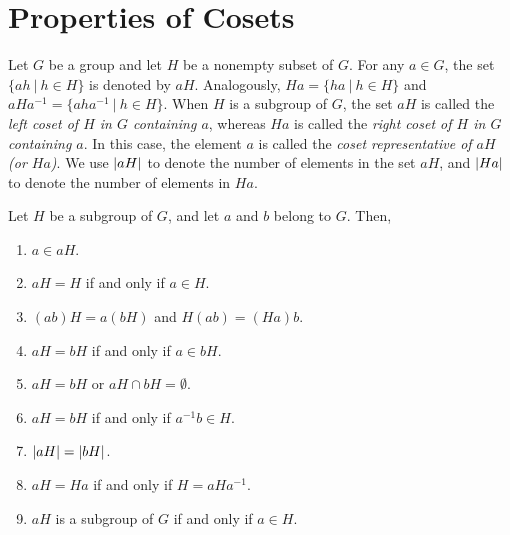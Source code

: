 \section{Properties of Cosets}

\begin{definition}
	Let $G$ be a group and let $H$ be a nonempty subset of $G$. For any $a \in G$, the set $\{ah\ \vert\ h \in H\}$ is denoted by $aH$. Analogously, $Ha = \{ha\ \vert\ h \in H\}$ and $aHa^{-1} = \{aha^{-1}\ \vert\ h \in H\}$. When $H$ is a subgroup of $G$, the set $aH$ is called the \textit{left coset of $H$ in $G$ containing $a$}, whereas $Ha$ is called the \textit{right coset of $H$ in $G$ containing $a$}. In this case, the element $a$ is called the \textit{coset representative of $aH$ (or $Ha$)}. We use $\left\lvert aH \right\rvert$ to denote the number of elements in the set $aH$, and $\left\lvert Ha \right\rvert$ to denote the number of elements in $Ha$.
\end{definition}

\begin{lem}
	Let $H$ be a subgroup of $G$, and let $a$ and $b$ belong to $G$. Then,
	\begin{enumerate}
		\item $a \in aH$.
		\item $aH = H$ if and only if $a \in H$.
		\item $(ab)H = a(bH)$ and $H(ab) = (Ha)b$.
		\item $aH = bH$ if and only if $a \in bH$.
		\item $aH = bH$ or $aH \cap bH = \emptyset$.
		\item $aH = bH$ if and only if $a^{-1}b \in H$.
		\item $\left\lvert aH \right\rvert=\left\lvert bH \right\rvert$.
		\item $aH = Ha$ if and only if $H = aHa^{-1}$.
		\item $aH$ is a subgroup of $G$ if and only if $a \in H$.
	\end{enumerate}
\end{lem}
